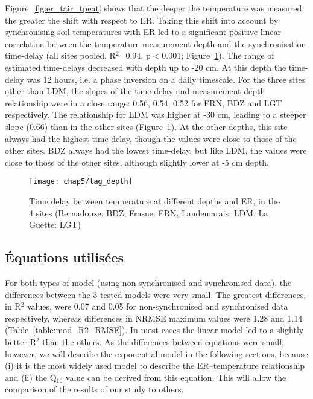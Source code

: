 Figure~\ref{fig:er_tair_tpeat} shows that the deeper the temperature was measured, the greater the shift with respect to ER.
Taking this shift into account by synchronising soil temperatures with ER led to a significant positive linear correlation between the temperature measurement depth and the synchronisation time-delay (all sites pooled, R$^2$=0.94, p$<$0.001; Figure~\ref{fig:lag_depth}).
The range of estimated time-delays decreased with depth up to -20 cm.
At this depth the time-delay was 12 hours, i.e. a phase inversion on a daily timescale.
For the three sites other than LDM, the slopes of the time-delay and measurement depth relationship were in a close range: 0.56, 0.54, 0.52 for FRN, BDZ and LGT respectively.
The relationship for LDM was higher at -30 cm, leading to a steeper slope (0.66) than in the other sites (Figure~\ref{fig:lag_depth}).
At the other depths, this site always had the highest time-delay, though the values were close to those of the other sites.
BDZ always had the lowest time-delay, but like LDM, the values were close to those of the other sites, although slightly lower at -5 cm depth.

\begin{figure}[h]
\centering
\texttt{[image: chap5/lag\_depth]}
\caption{Time delay between temperature at different depths and ER, in the 4 sites (Bernadouze: BDZ, Frasne: FRN, Landemarais: LDM, La Guette: LGT)}
\label{fig:lag_depth}
\end{figure}

\subsection{Équations utilisées}

For both types of model (using non-synchronised and synchronised data), the differences between the 3 tested models were very small. 
The greatest differences, in R$^{2}$ values, were 0.07 and 0.05 for non-synchronised and synchronised data respectively, whereas differences in NRMSE maximum values were 1.28 and 1.14 (Table~\ref{table:mod_R2_RMSE}).
In most cases the linear model led to a slightly better R$^2$ than the others.
As the differences between equations were small, however, we will describe the exponential model in the following sections, because (i) it is the most widely used model to describe the ER--temperature relationship and (ii) the Q$_{10}$ value can be derived from this equation. 
This will allow the comparison of the results of our study to others.

